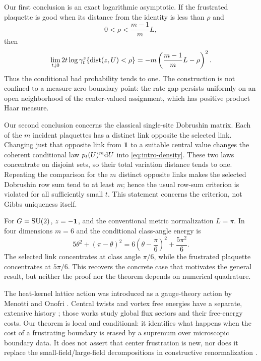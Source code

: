 Our first conclusion is an exact logarithmic asymptotic.  If the frustrated
plaquette is good when its distance from the identity is less than $\rho$ and
\begin{equation}\label{eq:intro-threshold}
  0<\rho<\frac{m-1}{m}L,
\end{equation}
then
\begin{equation}\label{eq:intro-rate}
 \lim_{t\downarrow0}2t\log\gamma_t^z
 \{\operatorname{dist}(z,U)<\rho\}
 =-m\left(\frac{m-1}{m}L-\rho\right)^2.
\end{equation}
Thus the conditional bad probability tends to one.  The construction is not
confined to a measure-zero boundary point: the rate gap persists uniformly
on an open neighborhood of the center-valued assignment, which has positive
product Haar measure.

Our second conclusion concerns the classical single-site Dobrushin matrix.
Each of the $m$ incident plaquettes has a distinct link opposite the selected
link.  Changing just that opposite link from $\mathbf 1$ to a suitable central
value changes the coherent conditional law $p_t(U)^m\mathrm dU$ into
\eqref{eq:intro-density}.  These two laws concentrate on disjoint sets, so
their total variation distance tends to one.  Repeating the comparison for
the $m$ distinct opposite links makes the selected Dobrushin row sum tend to
at least $m$; hence the usual row-sum criterion is violated for all
sufficiently small $t$.  This statement concerns the criterion, not Gibbs
uniqueness itself.

For $G=\mathrm{SU}(2)$, $z=-\mathbf 1$, and the conventional metric normalization
$L=\pi$.  In four dimensions $m=6$ and the conditional class-angle energy is
\[
  5\theta^2+(\pi-\theta)^2
  =6\left(\theta-\frac\pi6\right)^2+\frac{5\pi^2}{6}.
\]
The selected link concentrates at class angle $\pi/6$, while the frustrated
plaquette concentrates at $5\pi/6$.  This recovers the concrete case that
motivates the general result, but neither the proof nor the theorem depends
on numerical quadrature.

The heat-kernel lattice action was introduced as a gauge-theory action by
Menotti and Onofri \cite{MenottiOnofri1981}.  Central twists and vortex free
energies have a separate, extensive history
\cite{tHooft1979,MackPetkova1980,deForcrandVonSmekal2002}; those works study
global flux sectors and their free-energy costs.  Our theorem is local and
conditional: it identifies what happens when the cost of a frustrating
boundary is erased by a supremum over microscopic boundary data.  It does
not assert that center frustration is new, nor does it replace the
small-field/large-field decompositions in constructive renormalization
\cite{Balaban1987,Balaban1988,Balaban1989}.


